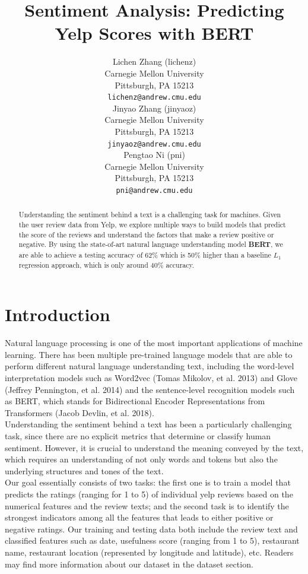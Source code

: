 \documentclass{article}
\title{Sentiment Analysis: Predicting Yelp Scores with BERT}
\author{
  Lichen Zhang (lichenz)\\
  Carnegie Mellon University\\
  Pittsburgh, PA 15213 \\
  \texttt{lichenz@andrew.cmu.edu} \\
  \And
  Jinyao Zhang (jinyaoz)\\
  Carnegie Mellon University \\
  Pittsburgh, PA 15213 \\
  \texttt{jinyaoz@andrew.cmu.edu} \\
  \AND
  Pengtao Ni (pni)\\
  Carnegie Mellon University \\
  Pittsburgh, PA 15213 \\
  \texttt{pni@andrew.cmu.edu} 
}
\begin{document}

\maketitle

\begin{abstract}
  Understanding the sentiment behind a text is a challenging task for machines. Given the user review data from Yelp, we explore multiple ways to build models that predict the score of the reviews and understand the factors that make a review positive or negative. By using the state-of-art natural language understanding model \textbf{BERT}, we are able to achieve a testing accuracy of 62\% which is 50\% higher than a baseline $L_1$ regression approach, which is only around 40\% accuracy.
\end{abstract}

\section{Introduction}

Natural language processing is one of the most important applications of machine learning. There has been multiple pre-trained language models that are able to perform different natural language understanding text, including the word-level interpretation models such as Word2vec (Tomas Mikolov, et al. 2013)\cite{3}
and Glove (Jeffrey Pennington, et al. 2014)\cite{4}
 and the sentence-level recognition models such as BERT, which stands for Bidirectional Encoder Representations from Transformers (Jacob Devlin, et al. 2018)\cite{2}. \\
 
Understanding the sentiment behind a text has been a particularly challenging task, since there are no explicit metrics that determine or classify human sentiment. However, it is crucial to understand the meaning conveyed by the text, which requires an understanding of not only words and tokens but also the underlying structures and tones of the text. \\
 
Our goal essentially consists of two tasks: the first one is to train a model that predicts the ratings (ranging for 1 to 5) of individual yelp reviews based on the numerical features and the review texts; and the second task is to identify the strongest indicators among all the features that leads to either positive or negative ratings. Our training and testing data both include the review text and classified features such as date, usefulness score (ranging from 1 to 5), restaurant name, restaurant location (represented by longitude and latitude), etc. Readers may find more information about our dataset in the dataset section. \\
\end{document}
